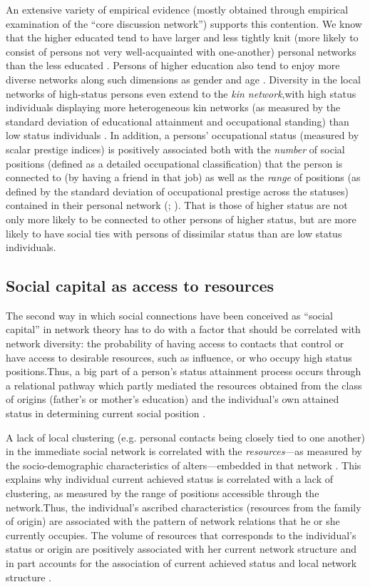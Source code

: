 \documentclass[12pt]{article}
\begin{document}
An extensive variety of empirical evidence (mostly obtained through empirical examination of the ``core discussion network'') supports this contention. We know that the higher educated tend to have larger and less tightly knit (more likely to consist of persons not very well-acquainted with one-another) personal networks than the less educated \citep[129]{marsden87}.  Persons of higher education also tend to enjoy more diverse networks along such dimensions as gender and age \citep{fischer82}. Diversity in the local networks of high-status persons even extend to the \emph{kin network},with high status individuals displaying more heterogeneous kin networks (as measured by the standard deviation of educational attainment and occupational standing) than low status individuals \citep{goldstein_warren00}. In addition, a persons' occupational status (measured by scalar prestige indices) is positively associated both with the \emph{number} of social positions (defined as a detailed occupational classification) that the person is connected to (by having a friend in that job) as well as the \emph{range} of positions (as defined by the standard deviation of occupational prestige across the statuses) contained in their personal network (\citealp[90]{lin01b}; \citealp{lin_dumin86}). That is those of higher status are not only more likely to be connected to other persons of higher status, but are more likely to have social ties with persons of dissimilar status than are low status individuals.

\subsection{Social capital as access to resources}
The second way in which social connections have been conceived as ``social capital'' in network theory has to do with a factor that should be correlated with network diversity: the probability of having access to contacts that control or have access to desirable resources, such as influence, or who occupy high status positions.Thus, a big part of a person's status attainment process occurs through a relational pathway which partly mediated the resources obtained from the class of origins (father's or mother's education) and the individual's own attained status in determining current social position \citep{lin01a}.

A lack of local clustering (e.g. personal contacts being closely tied to one another) in the immediate social network is correlated with the \emph{resources}---as measured by the socio-demographic characteristics of alters---embedded in that network \citep{lin01a}. This explains why individual current achieved status is correlated with a lack of clustering, as measured by the range of positions accessible through the network.Thus, the individual's ascribed characteristics (resources from the family of origin) are associated with the pattern of network relations that he or she currently occupies. The volume of resources that corresponds to the individual's status or origin are positively associated with her current network structure and in part accounts for the association of current achieved status and local network structure \citep{lin90, lin01b}. 
\end{document}
